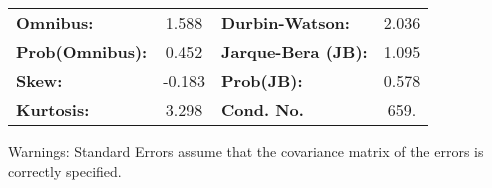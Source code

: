 \documentclass{report}
\begin{document}
\begin{center}
\begin{tabular}{lcccccc}
\bottomrule
\end{tabular}
\begin{tabular}{lclc}
\textbf{Omnibus:}       &  1.588 & \textbf{  Durbin-Watson:     } &    2.036  \\
\textbf{Prob(Omnibus):} &  0.452 & \textbf{  Jarque-Bera (JB):  } &    1.095  \\
\textbf{Skew:}          & -0.183 & \textbf{  Prob(JB):          } &    0.578  \\
\textbf{Kurtosis:}      &  3.298 & \textbf{  Cond. No.          } &     659.  \\
\bottomrule
\end{tabular}
\end{center}

Warnings: \newline
 [1] Standard Errors assume that the covariance matrix of the errors is correctly specified.
\end{document}
